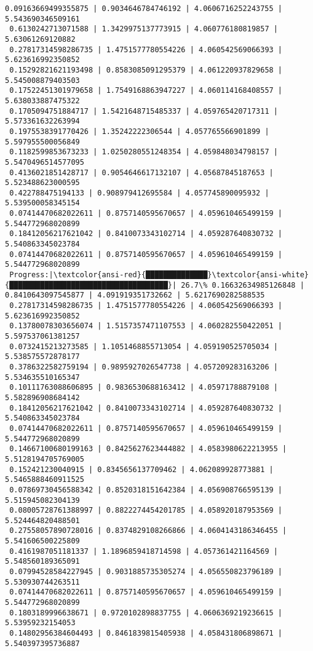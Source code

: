 \documentclass[11pt]{article}
\begin{document}
\begin{Verbatim}[commandchars=\\\{\}]
 0.09163669499355875 | 0.9034646784746192 | 4.0606716252243755 | 5.543690346509161
 0.6130242713071588 | 1.3429975137773915 | 4.060776180819857 | 5.63061269120882
 0.27817314598286735 | 1.4751577780554226 | 4.060542569066393 | 5.623616992350852
 0.15292821621193498 | 0.8583085091295379 | 4.061220937829658 | 5.545008879403503
 0.17522451301979658 | 1.7549168863947227 | 4.060114168408557 | 5.638033887475322
 0.1705094751884717 | 1.5421648715485337 | 4.059765420717311 | 5.573361632263994
 0.1975538391770426 | 1.35242222306544 | 4.057765566901899 | 5.597955500056849
 0.1182599853673233 | 1.0250280551248354 | 4.059848034798157 | 5.5470496514577095
 0.4136021851428717 | 0.9054646617132107 | 4.05687845187653 | 5.523488623000595
 0.422788475194133 | 0.908979412695584 | 4.057745890095932 | 5.539500058345154
 0.07414470682022611 | 0.8757140595670657 | 4.059610465499159 | 5.544772968020899
 0.18412056217621042 | 0.8410073343102714 | 4.059287640830732 | 5.540863345023784
 0.07414470682022611 | 0.8757140595670657 | 4.059610465499159 | 5.544772968020899
 Progress:|\textcolor{ansi-red}{██████████████}\textcolor{ansi-white}{████████████████████████████████████}| 26.7\% 0.16632634985126848 | 0.8410643097545877 | 4.091919351732662 | 5.6217690282588535
 0.27817314598286735 | 1.4751577780554226 | 4.060542569066393 | 5.623616992350852
 0.13780078303656074 | 1.5157357471107553 | 4.060282550422051 | 5.597537061381257
 0.0732415213273585 | 1.1051468855713054 | 4.059190525705034 | 5.538575572878177
 0.3786322582759194 | 0.9895927026547738 | 4.057209283163206 | 5.534635510165347
 0.10111763088606895 | 0.9836530688163412 | 4.05971788879108 | 5.582896908684142
 0.18412056217621042 | 0.8410073343102714 | 4.059287640830732 | 5.540863345023784
 0.07414470682022611 | 0.8757140595670657 | 4.059610465499159 | 5.544772968020899
 0.14667100680199163 | 0.8425627623444882 | 4.0583980622213955 | 5.5128194705769005
 0.152421230040915 | 0.8345656137709462 | 4.062089928773881 | 5.5465888460911525
 0.07869730456588342 | 0.8520318151642384 | 4.056908766595139 | 5.515945082304139
 0.08005728761388997 | 0.8822274454201785 | 4.058920187953569 | 5.524464820488501
 0.27558057890728016 | 0.8374829108266866 | 4.0604143186346455 | 5.541606500225809
 0.4161987051181337 | 1.1896859418714598 | 4.057361421164569 | 5.548560189365091
 0.07994528584227945 | 0.9031885735305274 | 4.056550823796189 | 5.530930744263511
 0.07414470682022611 | 0.8757140595670657 | 4.059610465499159 | 5.544772968020899
 0.1803189996638671 | 0.9720102898837755 | 4.0606369219236615 | 5.53959232154053
 0.14802956384604493 | 0.8461839815405938 | 4.058431806898671 | 5.540397395736887

\end{Verbatim}
\end{document}
